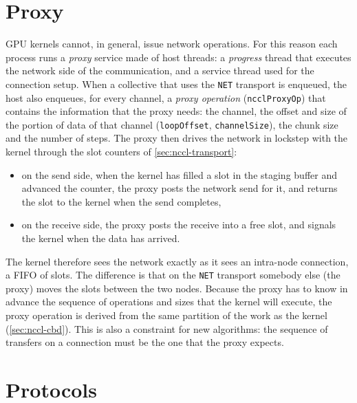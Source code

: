 \section{Proxy}\label{sec:nccl-proxy}

GPU kernels cannot, in general, issue network operations.
For this reason each process runs a \emph{proxy} service made of host threads: a \emph{progress} thread that executes the network side of the communication, and a service thread used for the connection setup.
When a collective that uses the \texttt{NET} transport is enqueued, the host also enqueues, for every channel, a \emph{proxy operation} (\texttt{ncclProxyOp}) that contains the information that the proxy needs: the channel, the offset and size of the portion of data of that channel (\texttt{loopOffset}, \texttt{channelSize}), the chunk size and the number of steps.
The proxy then drives the network in lockstep with the kernel through the slot counters of \cref{sec:nccl-transport}:
\begin{itemize}
  \item on the send side, when the kernel has filled a slot in the staging buffer and advanced the counter, the proxy posts the network send for it, and returns the slot to the kernel when the send completes,
  \item on the receive side, the proxy posts the receive into a free slot, and signals the kernel when the data has arrived.
\end{itemize}
The kernel therefore sees the network exactly as it sees an intra-node connection, a FIFO of slots. The difference is that on the \texttt{NET} transport somebody else (the proxy) moves the slots between the two nodes.
Because the proxy has to know in advance the sequence of operations and sizes that the kernel will execute, the proxy operation is derived from the same partition of the work as the kernel (\cref{sec:nccl-cbd}).
This is also a constraint for new algorithms: the sequence of transfers on a connection must be the one that the proxy expects.

\section{Protocols}\label{sec:nccl-protocols}

